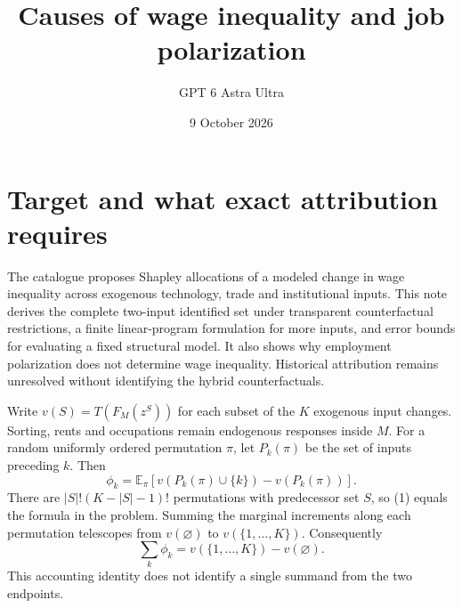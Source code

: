 \documentclass[11pt]{article}
\title{Causes of wage inequality and job polarization}
\author{GPT 6 Astra Ultra}
\date{9 October 2026}
\theoremstyle{definition}
\newcommand{\E}{\mathbb E}
\begin{document}
\maketitle
\section*{Target and what exact attribution requires}
The catalogue proposes Shapley allocations of a modeled change in wage
inequality across exogenous technology, trade and institutional inputs. This
note derives the complete two-input identified set under transparent
counterfactual restrictions, a finite linear-program formulation for more inputs,
and error bounds for evaluating a fixed structural model. It also shows why
employment polarization does not determine wage inequality. Historical
attribution remains unresolved without identifying the hybrid counterfactuals.

Write $v(S)=T(F_M(z^S))$ for each subset of the $K$ exogenous input changes.
Sorting, rents and occupations remain endogenous responses inside $M$.
For a random uniformly ordered permutation $\pi$, let $P_k(\pi)$ be the set
of inputs preceding $k$. Then
\[
 \phi_k=\E_\pi[v(P_k(\pi)\cup\{k\})-v(P_k(\pi))].       \tag{1}
\]
There are $|S|!(K-|S|-1)!$ permutations with predecessor set $S$, so (1)
equals the formula in the problem. Summing the marginal increments along each
permutation telescopes from $v(\varnothing)$ to $v(\{1,\ldots,K\})$.
Consequently
\[
 \sum_k\phi_k=v(\{1,\ldots,K\})-v(\varnothing).          \tag{2}
\]
This accounting identity does not identify a single summand from the two endpoints.
\end{document}
